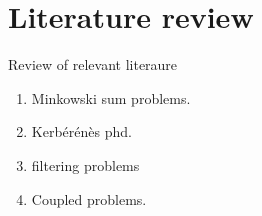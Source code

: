 \section{Literature review}

Review of relevant literaure

\begin{enumerate}
	\item Minkowski sum problems.
	\item Kerbérénès phd.
	\item filtering problems
	\item Coupled problems.
\end{enumerate}
